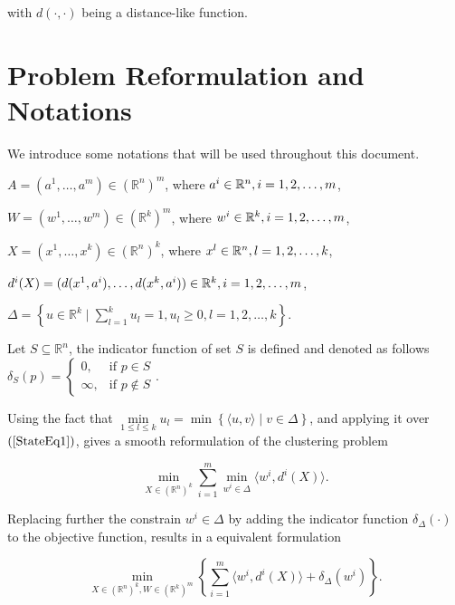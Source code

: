 \documentclass[11pt]{article}
\numberwithin{equation}{section}
\begin{document}
\noindent with $\textit{d}(\cdot ,\cdot)$ being a distance-like function.


\section{Problem Reformulation and Notations}

We introduce some notations that will be used throughout this document.

\noindent $A = (a^1, \ldots , a^m) \in \left(\mathbb{R}^n\right)^m$, where $a^i \in \mathbb{R}^n,\smallskip i=1, 2, \ldots , m$,

\noindent $W = (w^1, \ldots , w^m) \in \left(\mathbb{R}^k\right)^m$, where $w^i \in \mathbb{R}^k,\smallskip i=1, 2, \ldots , m$,

\noindent $X = (x^1, \ldots , x^k) \in \left(\mathbb{R}^n\right)^k$, where $x^l \in \mathbb{R}^n,\smallskip l=1, 2, \ldots , k$,

\noindent $d^{i}(X) = (d(x^1,a^i), \ldots , d(x^k,a^i)) \in \mathbb{R}^k,\smallskip i=1, 2, \ldots , m$,

\noindent $\Delta = \left\lbrace u \in \mathbb{R}^k \mid \sum\limits_{l=1}^{k} u_l = 1, u_l \geq 0 , l=1, 2, \ldots ,k \right\rbrace$.

\noindent Let $S \subseteq \mathbb{R}^n$, the indicator function of set $S$ is defined and denoted as follows \\ $\delta_S(p) = \begin{cases} 0, &\mbox{if } p \in S \\ 
\infty, &\mbox{if } p \not\in S \end{cases}.$

Using the fact that $\min\limits_{1 \leq l \leq k} u_l = \min \left\lbrace \langle u,v \rangle \mid v \in \Delta \right\rbrace$, and applying it over $\left(\ref{StateEq1}\right)$, gives a smooth reformulation of the clustering problem

\begin{equation}
	\min\limits_{X \in \left(\mathbb{R}^n\right)^k} \sum\limits_{i=1}^{m} \min\limits_{w^i \in \Delta} \langle w^i , d^i(X) \rangle. \label{StateEq2}
\end{equation}

Replacing further the constrain $w^i \in \Delta$ by adding the indicator function $\delta_{\Delta}(\cdot)$ to the objective function, results in a equivalent formulation

\begin{equation}
	\min\limits_{X \in \left(\mathbb{R}^n\right)^k , W \in \left(\mathbb{R}^k\right)^m} \left\lbrace \sum\limits_{i=1}^{m} \langle w^i , d^i(X) \rangle + \delta_{\Delta}(w^i) \right\rbrace . \label{StateEq3}
\end{equation}
\end{document}
